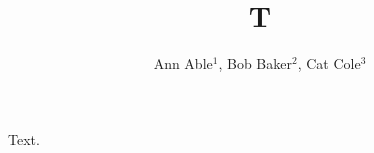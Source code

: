 \documentclass[sigconf]{acmart}
\begin{document}
\title{T}
\author{Ann Able$^1$, Bob Baker$^2$, Cat Cole$^3$}
\maketitle
Text.
\end{document}
